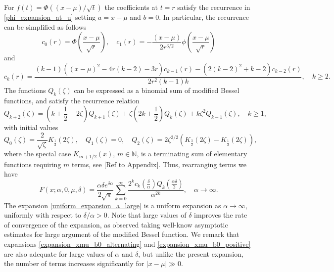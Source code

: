 \documentclass[10pt,a4paper,oneside]{article}
\numberwithin{equation}{section}
\begin{document}
For $f(t) = \Phi((x-\mu)/\sqrt{t})$ the coefficients at $t=r$ satisfy the recurrence in \eqref{phi_expansion_at_u} setting $a=x-\mu$ and $b=0$. In particular, the recurrence can be simplified as follows
\begin{equation}
c_0(r) = \Phi\left(\frac{x-\mu}{\sqrt{r}}\right), \quad c_1(r) = -\frac{(x-\mu)}{2 r^{3/2}} \phi\left(\frac{x-\mu}{\sqrt{r}}\right)
\end{equation}
and
\begin{equation}
c_k(r) = \frac{(k - 1) ((x-\mu)^2 - 4 r(k-2) - 3r) c_{k-1}(r) - (2(k-2)^2 + k-2) c_{k-2}(r)}{2r^2 (k-1) k}, \quad k\ge 2.
\end{equation}
The functions $Q_k(\zeta)$ can be expressed as a binomial sum of modified Bessel functions, and satisfy the recurrence relation \cite[\S 27.3.28]{Temme2015}
\begin{equation}
Q_{k+2}(\zeta) = \left(k + \frac{1}{2} -2\zeta\right) Q_{k+1}(\zeta) + \zeta\left(2k + \frac{1}{2}\right)Q_k(\zeta) + k\zeta^2 Q_{k-1}(\zeta), \quad k\ge 1,
\end{equation}
with initial values
\begin{equation}
Q_0(\zeta) = \frac{2}{\sqrt{\zeta}} K_{\frac{1}{2}}(2 \zeta), \quad Q_1(\zeta) = 0, \quad Q_2(\zeta) = 2 \zeta^{3/2} \left(K_{\frac{3}{2}}(2\zeta) - K_{\frac{1}{2}}(2 \zeta)\right),
\end{equation}
where the special case $K_{m+1/2}(x)$, $m \in \mathbb{N}$, is a terminating sum of elementary functions requiring $m$ terms, see [Ref to Appendix]. Thus, rearranging terms we have
\begin{equation}\label{uniform_expansion_a_large}
F(x; \alpha, 0, \mu, \delta) = \frac{\alpha \delta e^{\delta \alpha}}{2 \sqrt{\pi}} \sum_{k=0}^{\infty} \frac{2^k c_k\left(\frac{\delta}{\alpha}\right) Q_k\left(\frac{\alpha \delta}{2}\right)}{\alpha^{2k}}, \quad \alpha \to \infty.
\end{equation}
The expansion \eqref{uniform_expansion_a_large} is a uniform expansion as $\alpha \to \infty$, uniformly with respect to $\delta / \alpha > 0$. Note that large values of $\delta$ improves the rate of convergence of the expansion, as observed taking well-know asymptotic estimates for large argument of the modified Bessel function. We remark that expansions \eqref{expansion_xmu_b0_alternating} and \eqref{expansion_xmu_b0_positive} are also adequate for large values of $\alpha$ and $\delta$, but unlike the present expansion, the number of terms increases significantly for $|x-\mu| \gg 0$.
\end{document}
